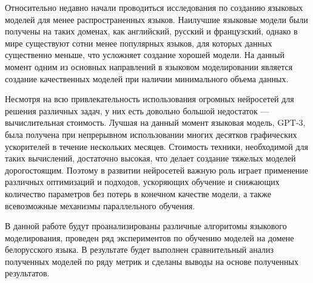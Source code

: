 Относительно недавно начали проводиться исследования по созданию языковых моделей для менее распространенных языков. Наилучшие языковые модели были получены на таких доменах, как английский, русский и французский, однако в мире существуют сотни менее популярных языков, для которых данных существенно меньше, что усложняет создание хорошей модели. На данный момент одним из основных направлений в языковом моделировании является создание качественных моделей при наличии минимального объема данных.

Несмотря на всю привлекательность использования огромных нейросетей для решения различных задач, у них есть довольно большой недостаток --- вычислительная стоимость. Лучшая на данный момент языковая модель, GPT-3, была получена при непрерывном использовании многих десятков графических ускорителей в течение нескольких месяцев. Стоимость техники, необходимой для таких вычислений, достаточно высокая, что делает создание тяжелых моделей дорогостоящим. Поэтому в развитии нейросетей важную роль играет применение различных оптимизаций и подходов, ускоряющих обучение и снижающих количество параметров без потерь в конечном качестве модели, а также всевозможные механизмы параллельного обучения.

В данной работе будут проанализированы различные алгоритомы языкового моделирования, проведен ряд экспериментов по обучению моделей на домене белорусского языка. В результате будет выполнен сравнительный анализ полученных моделей по ряду метрик и сделаны выводы на основе полученных результатов.
